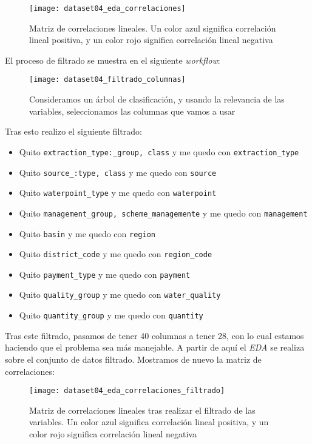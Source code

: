 \documentclass[11pt]{article}
\begin{document}
\begin{figure}[H]
    \centering
    \texttt{[image: dataset04\_eda\_correlaciones]}
    \caption{Matriz de correlaciones lineales. Un color azul significa correlación lineal positiva, y un color rojo significa correlación lineal negativa}
\end{figure}

El proceso de filtrado se muestra en el siguiente \emph{workflow}:

\begin{figure}[H]
    \centering
    \texttt{[image: dataset04\_filtrado\_columnas]}
    \caption{Consideramos un árbol de clasificación, y usando la relevancia de las variables, seleccionamos las columnas que vamos a usar}
\end{figure}

Tras esto realizo el siguiente filtrado:

\begin{itemize}
    \item Quito \lstinline{extraction_type:_group, class} y me quedo con \lstinline{extraction_type}
    \item Quito \lstinline{source_:type, class} y me quedo con \lstinline{source}
    \item Quito \lstinline{waterpoint_type} y me quedo con \lstinline{waterpoint}
    \item Quito \lstinline{management_group, scheme_managemente} y me quedo con \lstinline{management}
    \item Quito \lstinline{basin} y me quedo con \lstinline{region}
    \item Quito \lstinline{district_code} y me quedo con \lstinline{region_code}
    \item Quito \lstinline{payment_type} y me quedo con \lstinline{payment}
    \item Quito \lstinline{quality_group} y me quedo con \lstinline{water_quality}
    \item Quito \lstinline{quantity_group} y me quedo con \lstinline{quantity}
\end{itemize}

Tras este filtrado, pasamos de tener 40 columnas a tener 28, con lo cual estamos haciendo que el problema sea más manejable. A partir de aquí el \emph{EDA} se realiza sobre el conjunto de datos filtrado. Mostramos de nuevo la matriz de correlaciones:

\begin{figure}[H]
    \centering
    \texttt{[image: dataset04\_eda\_correlaciones\_filtrado]}
    \caption{Matriz de correlaciones lineales tras realizar el filtrado de las variables. Un color azul significa correlación lineal positiva, y un color rojo significa correlación lineal negativa}
\end{figure}
\end{document}
